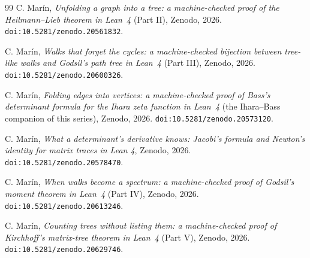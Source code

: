 \documentclass[11pt]{article}
\begin{document}
\begin{thebibliography}{99}
 C. Mar\'in,
\emph{Unfolding a graph into a tree: a machine-checked proof of the Heilmann--Lieb theorem
in Lean~4} (Part II), Zenodo, 2026. \texttt{doi:10.5281/zenodo.20561832}.

 C. Mar\'in,
\emph{Walks that forget the cycles: a machine-checked bijection between tree-like walks and
Godsil's path tree in Lean~4} (Part III), Zenodo, 2026. \texttt{doi:10.5281/zenodo.20600326}.

 C. Mar\'in,
\emph{Folding edges into vertices: a machine-checked proof of Bass's determinant formula
for the Ihara zeta function in Lean~4} (the Ihara--Bass companion of this series), Zenodo,
2026. \texttt{doi:10.5281/zenodo.20573120}.

 C. Mar\'in,
\emph{What a determinant's derivative knows: Jacobi's formula and Newton's identity for
matrix traces in Lean 4}, Zenodo, 2026. \texttt{doi:10.5281/zenodo.20578470}.

 C. Mar\'in,
\emph{When walks become a spectrum: a machine-checked proof of Godsil's moment theorem in
Lean~4} (Part IV), Zenodo, 2026. \texttt{doi:10.5281/zenodo.20613246}.

 C. Mar\'in,
\emph{Counting trees without listing them: a machine-checked proof of Kirchhoff's
matrix-tree theorem in Lean~4} (Part V), Zenodo, 2026. \texttt{doi:10.5281/zenodo.20629746}.

\end{thebibliography}
\end{document}
